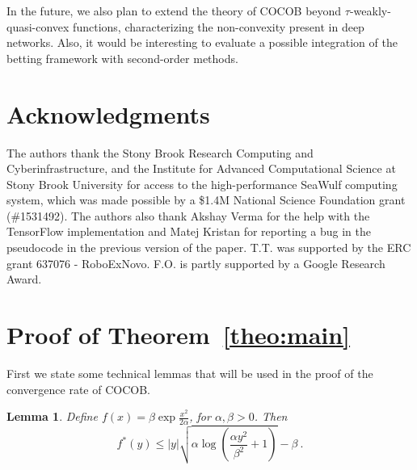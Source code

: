 \documentclass{article}
\newtheorem{lemma}{Lemma}
\begin{document}
In the future, we also plan to extend the theory of COCOB beyond $\tau$-weakly-quasi-convex functions, 
characterizing the non-convexity present in deep networks.
Also, it would be interesting to evaluate a possible integration of the betting framework with second-order methods.
 
\section*{Acknowledgments}
The authors thank the Stony Brook Research Computing and Cyberinfrastructure, and the Institute for 
Advanced Computational Science at Stony Brook University for access to the high-performance SeaWulf 
computing system, which was made possible by a \$1.4M National Science Foundation grant (\#1531492). 
The authors also thank Akshay Verma for the help with the TensorFlow implementation and Matej Kristan 
for reporting a bug in the pseudocode in the previous version of the paper. T.T. was supported by the 
ERC grant 637076 - RoboExNovo. F.O. is partly supported by a Google Research Award.





\appendix

\section{Proof of Theorem~\ref{theo:main}}
\label{sec:proof_main}

First we state some technical lemmas that will be used in the proof of the convergence rate of COCOB.

\begin{lemma}{\cite[extended version, Lemma~18]{OrabonaP16b}}
\label{lemma:dual}
Define $f(x)= \beta \exp\frac{x^2}{2 \alpha}$, for $\alpha,\beta>0$. Then
\[
f^*(y) \leq |y| \sqrt{\alpha \log \left(\frac{\alpha y^2}{\beta^2} +1 \right)} - \beta~.
\]
\end{lemma}
\end{document}
